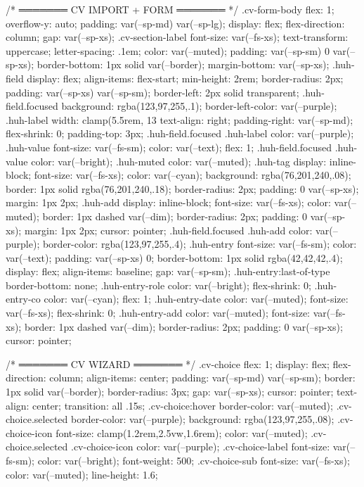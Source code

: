 {{{{{{{{{{{{{/* ═══════ CV IMPORT + FORM ═══════ */
.cv-form-body {
  flex: 1; overflow-y: auto;
  padding: var(--sp-md) var(--sp-lg);
  display: flex; flex-direction: column; gap: var(--sp-xs);
}
.cv-section-label {
  font-size: var(--fs-xs); text-transform: uppercase; letter-spacing: .1em;
  color: var(--muted); padding: var(--sp-sm) 0 var(--sp-xs);
  border-bottom: 1px solid var(--border); margin-bottom: var(--sp-xs);
}
.huh-field {
  display: flex; align-items: flex-start;
  min-height: 2rem; border-radius: 2px;
  padding: var(--sp-xs) var(--sp-sm);
  border-left: 2px solid transparent;
}
.huh-field.focused { background: rgba(123,97,255,.1); border-left-color: var(--purple); }
.huh-label {
  width: clamp(5.5rem, 13%
  text-align: right; padding-right: var(--sp-md); flex-shrink: 0; padding-top: 3px;
}
.huh-field.focused .huh-label { color: var(--purple); }
.huh-value { font-size: var(--fs-sm); color: var(--text); flex: 1; }
.huh-field.focused .huh-value { color: var(--bright); }
.huh-muted { color: var(--muted); }
.huh-tag {
  display: inline-block; font-size: var(--fs-xs);
  color: var(--cyan); background: rgba(76,201,240,.08);
  border: 1px solid rgba(76,201,240,.18); border-radius: 2px;
  padding: 0 var(--sp-xs); margin: 1px 2px;
}
.huh-add {
  display: inline-block; font-size: var(--fs-xs);
  color: var(--muted); border: 1px dashed var(--dim); border-radius: 2px;
  padding: 0 var(--sp-xs); margin: 1px 2px; cursor: pointer;
}
.huh-field.focused .huh-add { color: var(--purple); border-color: rgba(123,97,255,.4); }
.huh-entry {
  font-size: var(--fs-sm); color: var(--text);
  padding: var(--sp-xs) 0;
  border-bottom: 1px solid rgba(42,42,42,.4);
  display: flex; align-items: baseline; gap: var(--sp-sm);
}
.huh-entry:last-of-type { border-bottom: none; }
.huh-entry-role { color: var(--bright); flex-shrink: 0; }
.huh-entry-co   { color: var(--cyan); flex: 1; }
.huh-entry-date { color: var(--muted); font-size: var(--fs-xs); flex-shrink: 0; }
.huh-entry-add  { color: var(--muted); font-size: var(--fs-xs); border: 1px dashed var(--dim); border-radius: 2px; padding: 0 var(--sp-xs); cursor: pointer; }

/* ═══════ CV WIZARD ═══════ */
.cv-choice {
  flex: 1; display: flex; flex-direction: column; align-items: center;
  padding: var(--sp-md) var(--sp-sm);
  border: 1px solid var(--border); border-radius: 3px;
  gap: var(--sp-xs); cursor: pointer; text-align: center;
  transition: all .15s;
}
.cv-choice:hover { border-color: var(--muted); }
.cv-choice.selected { border-color: var(--purple); background: rgba(123,97,255,.08); }
.cv-choice-icon { font-size: clamp(1.2rem,2.5vw,1.6rem); color: var(--muted); }
.cv-choice.selected .cv-choice-icon { color: var(--purple); }
.cv-choice-label { font-size: var(--fs-sm); color: var(--bright); font-weight: 500; }
.cv-choice-sub { font-size: var(--fs-xs); color: var(--muted); line-height: 1.6; }

}}}}}}}}}}}}}
